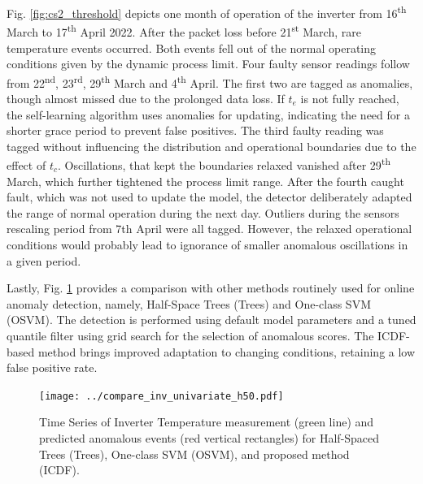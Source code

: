 Fig. \ref{fig:cs2_threshold} depicts one month of operation of the inverter from 16\textsuperscript{th} March to 17\textsuperscript{th} April 2022. After the packet loss before 21\textsuperscript{st} March, rare temperature events occurred. Both events fell out of the normal operating conditions given by the dynamic process limit. Four faulty sensor readings follow from 22\textsuperscript{nd}, 23\textsuperscript{rd}, 29\textsuperscript{th} March and 4\textsuperscript{th} April. The first two are tagged as anomalies, though almost missed due to the prolonged data loss. If $t_e$ is not fully reached, the self-learning algorithm uses anomalies for updating, indicating the need for a shorter grace period to prevent false positives. The third faulty reading was tagged without influencing the distribution and operational boundaries due to the effect of $t_c$. Oscillations, that kept the boundaries relaxed vanished after 29\textsuperscript{th} March, which further tightened the process limit range. After the fourth caught fault, which was not used to update the model, the detector deliberately adapted the range of normal operation during the next day. Outliers during the sensors rescaling period from 7th April were all tagged. However, the relaxed operational conditions would probably lead to ignorance of smaller anomalous oscillations in a given period.

Lastly, Fig. \ref{fig:comparison} provides a comparison with other methods routinely used for online anomaly detection, namely, Half-Space Trees (Trees) and One-class SVM (OSVM). The detection is performed using default model parameters and a tuned quantile filter using grid search for the selection of anomalous scores. The ICDF-based method brings improved adaptation to changing conditions, retaining a low false positive rate.
\begin{figure}[htbp]
 \centerline{\texttt{[image: ../compare\_inv\_univariate\_h50.pdf]}}
 \caption{Time Series of Inverter Temperature measurement (green line) and predicted anomalous events (red vertical rectangles) for Half-Spaced Trees (Trees), One-class SVM (OSVM), and proposed method (ICDF).}
 \label{fig:comparison}
\end{figure}
